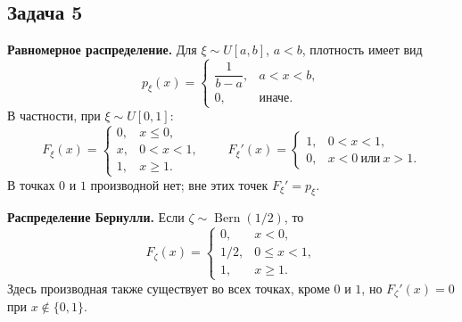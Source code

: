 \clearpage
\subsection{Задача 5}

\begingroup
\everymath{\textstyle}
\begin{solution}
    \textbf{Равномерное распределение.}
    Для $\xi\sim U[a,b]$, $a<b$, плотность имеет вид
    \[
        p_\xi(x)=\begin{cases}
            \dfrac1{b-a},&a<x<b,\\
            0,&\text{иначе}.
        \end{cases}
    \]
    В частности, при $\xi\sim U[0,1]$:
    \[
        F_\xi(x)=\begin{cases}
            0,&x\leq0,\\
            x,&0<x<1,\\
            1,&x\geq1.
        \end{cases}
        \qquad
        F_\xi'(x)=\begin{cases}
            1,&0<x<1,\\
            0,&x<0\ \text{или}\ x>1.
        \end{cases}
    \]
    В точках $0$ и $1$ производной нет; вне этих точек
    $F_\xi'=p_\xi$.

    \medskip
    \textbf{Распределение Бернулли.}
    Если $\zeta\sim\operatorname{Bern}(1/2)$, то
    \[
        F_\zeta(x)=\begin{cases}
            0,&x<0,\\
            1/2,&0\leq x<1,\\
            1,&x\geq1.
        \end{cases}
    \]
    Здесь производная также существует во всех точках, кроме $0$ и $1$,
    но $F_\zeta'(x)=0$ при $x\notin\{0,1\}$.


\end{solution}
